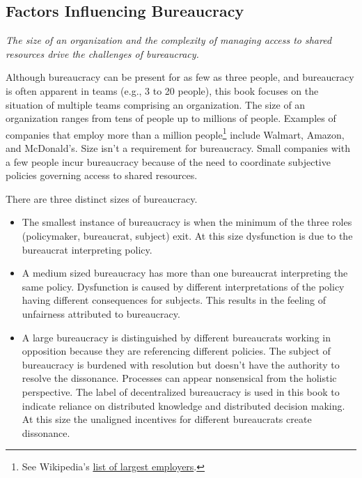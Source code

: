 \subsection*{Factors Influencing Bureaucracy}

\textit{The size of an organization and the complexity of managing access to shared resources drive the challenges of bureaucracy.}

Although bureaucracy can be present for as few as three people, and bureaucracy is often apparent in teams (e.g., 3 to 20 people), this book focuses on the situation of multiple teams comprising an organization. The size of an organization ranges from tens of people up to millions of people. 
Examples of companies that employ more than a million people\footnote{See Wikipedia's \href{https://en.wikipedia.org/wiki/List_of_largest_employers}{list of largest employers}.
} include Walmart, Amazon, and McDonald's. Size isn't a requirement for bureaucracy. Small companies with a few people incur bureaucracy because of the need to coordinate subjective policies governing access to shared resources. 


There are three distinct sizes of bureaucracy.
\begin{itemize}
\item The smallest instance of bureaucracy is when the minimum of the three roles (policymaker, bureaucrat, subject) exit. At this size dysfunction is due to the bureaucrat interpreting policy.
\item A medium sized bureaucracy has more than one bureaucrat interpreting the same policy. Dysfunction is caused by different interpretations of the policy having different consequences for subjects. This results in the feeling of unfairness attributed to bureaucracy.
\item A large bureaucracy is distinguished by different bureaucrats working in opposition because they are referencing different policies. The subject of bureaucracy is burdened with resolution but doesn't have the authority to resolve the dissonance. Processes can appear nonsensical from the holistic perspective.
The label of \gls{decentralized bureaucracy} is used in this book to indicate reliance on distributed knowledge and distributed decision making. At this size the unaligned incentives for different bureaucrats create dissonance.
\end{itemize}

